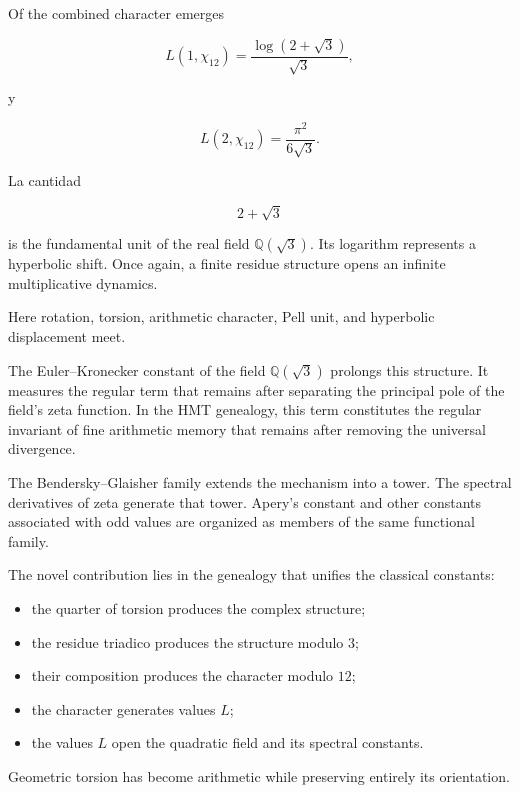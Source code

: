 Of the combined character emerges\par

\[
L(1,\chi_{12})
=
\frac{\log(2+\sqrt3)}{\sqrt3},
\]

y\par

\[
L(2,\chi_{12})
=
\frac{\pi^2}{6\sqrt3}.
\]

La cantidad\par

\[
2+\sqrt3
\]

is the fundamental unit of the real field \(\mathbb Q(\sqrt3)\). Its logarithm represents a hyperbolic shift. Once again, a finite residue structure opens an infinite multiplicative dynamics.\par

Here rotation, torsion, arithmetic character, Pell unit, and hyperbolic displacement meet.\par

The Euler–Kronecker constant of the field \(\mathbb Q(\sqrt3)\) prolongs this structure. It measures the regular term that remains after separating the principal pole of the field's zeta function. In the HMT genealogy, this term constitutes the regular invariant of fine arithmetic memory that remains after removing the universal divergence.\par

The Bendersky–Glaisher family extends the mechanism into a tower. The spectral derivatives of zeta generate that tower. Apery's constant and other constants associated with odd values are organized as members of the same functional family.\par

The novel contribution lies in the genealogy that unifies the classical constants:\par

\begin{itemize}[leftmargin=*,itemsep=0.35em]
\item the quarter of torsion produces the complex structure;
\item the residue triadico produces the structure modulo \(3\);
\item their composition produces the character modulo \(12\);
\item the character generates values \(L\);
\item the values \(L\) open the quadratic field and its spectral constants.
\end{itemize}

Geometric torsion has become arithmetic while preserving entirely its orientation.\par
